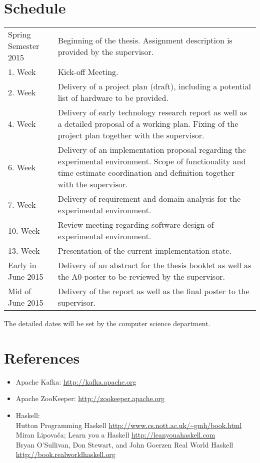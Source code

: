 \section*{Schedule}
\begin{table}[H]
\begin{tabular}{|l|p{10cm}|}
\cline{1-2}
{Spring Semester 2015}     & {Beginning of the thesis. Assignment
description is provided by the supervisor.} 
\\ \cline{1-2}

1. Week  & Kick-off Meeting.
  \\ \cline{1-2}
2. Week & Delivery of a project plan (draft), including a potential list of
  hardware to be provided.
  \\ \cline{1-2}
4. Week  & Delivery of early technology research
  report as well as a detailed proposal of a working plan. Fixing of the
project plan together with the supervisor. \\
\cline{1-2}
6. Week  & Delivery of an implementation proposal
regarding the experimental environment. Scope of functionality and time estimate
coordination and definition together with the supervisor.              \\
\cline{1-2}
7. Week  & Delivery of requirement and domain analysis for the experimental
environment.
  \\ \cline{1-2}
10. Week & Review meeting regarding software design of experimental environment.
  \\ \cline{1-2}
13. Week & Presentation of the current implementation state.
  \\ \cline{1-2}
Early in June 2015  & Delivery of an abstract for the
  thesis booklet as well as the A0-poster to be reviewed by the supervisor. \\
\cline{1-2}
Mid of June 2015   & Delivery of the report as well as the final poster to the
supervisor.
  \\ \cline{1-2}
\end{tabular}
\end{table}

The detailed dates will be set by the computer science department.

\section*{References}
\begin{itemize}
    \item [1] Apache Kafka: \url{http://kafka.apache.org}
    \item [2] Apache ZooKeeper: \url{http://zookeeper.apache.org}
    \item [3] Haskell: \\
           Hutton Programming Haskell
           \url{http://www.cs.nott.ac.uk/~gmh/book.html}\\
            Miran Lipovača; Learn you a Haskell
            \url{http://leanyouahaskell.com} \\
            Bryan O'Sullivan, Don Stewart, and John Goerzen  Real World Haskell 
            \url{http://book.realworldhaskell.org}
\end{itemize}

